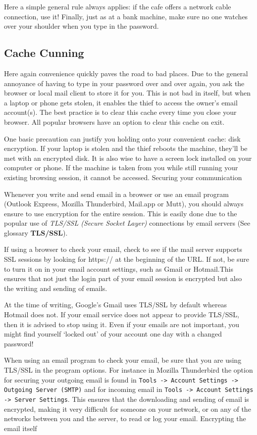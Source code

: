 Here a simple general rule always applies: if the cafe offers a network
cable connection, use it! Finally, just as at a bank machine, make sure
no one watches over your shoulder when you type in the password.

\subsection{Cache Cunning}

Here again convenience quickly paves the road to bad places. Due to the
general annoyance of having to type in your password over and over
again, you ask the browser or local mail client to store it for you.
This is not bad in itself, but when a laptop or phone gets stolen, it
enables the thief to access the owner's email account(s). The best
practice is to clear this cache every time you close your browser. All
popular browsers have an option to clear this cache on exit.

One basic precaution can justify you holding onto your convenient cache:
disk encryption. If your laptop is stolen and the thief reboots the
machine, they'll be met with an encrypted disk. It is also wise to have
a screen lock installed on your computer or phone. If the machine is
taken from you while still running your existing browsing session, it
cannot be accessed. Securing your communication

Whenever you write and send email in a browser or use an email program
(Outlook Express, Mozilla Thunderbird, Mail.app or Mutt), you should
always ensure to use encryption for the entire session. This is easily
done due to the popular use of \emph{TLS/SSL (Secure Socket Layer)}
connections by email servers (See glossary \textbf{TLS/SSL}).

If using a browser to check your email, check to see if the mail server
supports SSL sessions by looking for https:// at the beginning of the
URL. If not, be sure to turn it on in your email account settings, such
as Gmail or Hotmail.This ensures that not just the login part of your
email session is encrypted but also the writing and sending of emails.

At the time of writing, Google's Gmail uses TLS/SSL by default whereas
Hotmail does not. If your email service does not appear to provide
TLS/SSL, then it is advised to stop using it. Even if your emails are
not important, you might find yourself `locked out' of your account one
day with a changed password!

When using an email program to check your email, be sure that you are
using TLS/SSL in the program options. For instance in Mozilla
Thunderbird the option for securing your outgoing email is found in
\verb!Tools -> Account Settings -> Outgoing Server (SMTP)! and for
incoming email in \verb!Tools -> Account Settings -> Server Settings!.
This ensures that the downloading and sending of email is encrypted,
making it very difficult for someone on your network, or on any of the
networks between you and the server, to read or log your email.
Encrypting the email itself

